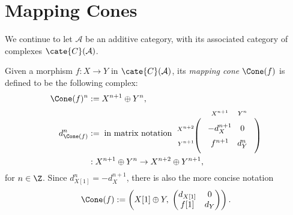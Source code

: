 
\section{Mapping Cones}\label{sec:mapping-cone}
\hypertarget{o014.aljabr2.chapter3.mapping-cone}{ }
\enlargethispage{2pt}

We continue to let $\mathcal{A}$ be an additive category, with its associated
category of complexes $\cate{C}(\mathcal{A})$.

\begin{definition}\label{def:Cone}
	Given a morphism $f:X\to Y$ in $\cate{C}(\mathcal{A})$, its
	\emph{mapping cone} $\Cone(f)$ is defined to be the following complex:
	\begin{align*}
		\Cone(f)^n & := X^{n+1} \oplus Y^n, \\
		d^n_{\Cone(f)} & := \;\text{in matrix notation}\;
		\begin{tikzpicture}[baseline]
			\matrix (M) [matrix of math nodes, ampersand replacement=\&, left delimiter=(, right delimiter=)] {
					-d_X^{n+1} \& 0 \\
					f^{n+1} \& d_Y^n \\
				};
				\node[above=1.2em] at (M-1-1) {\scriptsize $X^{n+1}$};
				\node[above=1.2em] at (M-1-2) {\scriptsize $Y^n$};
				\node[left=2.7em] at (M-1-1) {\scriptsize $X^{n+2}$};
				\node[left=2.7em] at (M-2-1) {\scriptsize $Y^{n+1}$};
		\end{tikzpicture} \\
		& : X^{n+1} \oplus Y^n \to X^{n+2} \oplus Y^{n+1} ,
	\end{align*}
	for $n\in\Z$. Since $d_{X[1]}^n=-d_X^{n+1}$, there is also the more
	concise notation
	\[ \Cone(f) := \left( X[1] \oplus Y , \; \begin{pmatrix} d_{X[1]} & 0 \\ f[1] & d_Y \end{pmatrix} \right) . \]
\end{definition}

